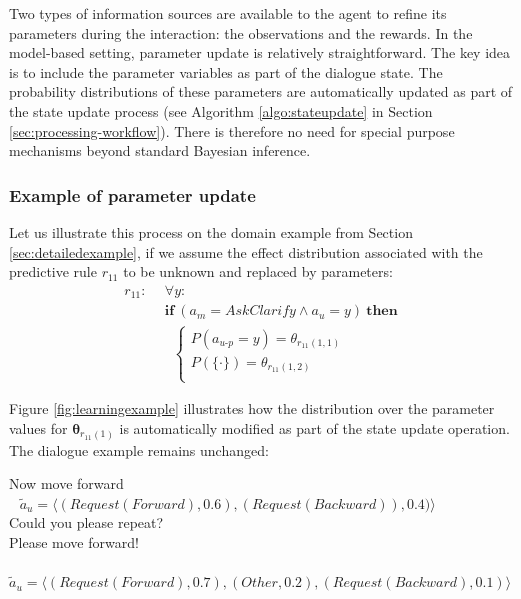 Two types of information sources are available to the agent to refine its parameters during the interaction: the observations and the rewards.  In the model-based setting, parameter update is relatively straightforward.  The key idea is to include the parameter variables as part of the dialogue state.  The probability distributions of these parameters are automatically updated as part of the state update process (see Algorithm \ref{algo:stateupdate} in Section \ref{sec:processing-workflow}). There is therefore no need for special purpose mechanisms beyond standard Bayesian inference.

\subsubsection*{Example of parameter update}

Let us illustrate this process on the domain example from Section \ref{sec:detailedexample}, if we assume the effect distribution associated with the predictive rule $r_{11}$ to be unknown and replaced by parameters: 
\begin{align*}
r_{11}: \ \ & \forall y: \\ 
& \textbf{if} \ (a_m = \mathit{AskClarify} \land a_u=y) \ \textbf{then} \\ 
& \; \;  \begin{cases} 
P(a_{u\mbox{-}p} = y) = \theta_{r_{11}(1,1)} \\ 
P(\{\cdot\}) = \theta_{r_{11}(1,2)} \\ 
\end{cases}
\end{align*}


Figure \ref{fig:learningexample} illustrates how the distribution over the parameter values for $\boldsymbol\theta_{r_{11}(1)}$ is automatically modified as part of the state update operation.  The dialogue example remains unchanged:
\begin{dialogue} 
 Now move forward \\ $\phantom{b}$ $\tilde{a}_u = \langle (\mathit{Request(Forward)}, 0.6), (\mathit{Request(Backward)}), 0.4)\rangle$  \\[-3mm]
 Could you please repeat? \\[-3mm]
 Please move forward! \\ $\phantom{b}$ $\tilde{a}_u = \langle (\mathit{Request(Forward)}, 0.7), (\mathit{Other}, 0.2), (\mathit{Request(Backward)}, 0.1) \rangle$ \\[-4mm]
\end{dialogue} 

